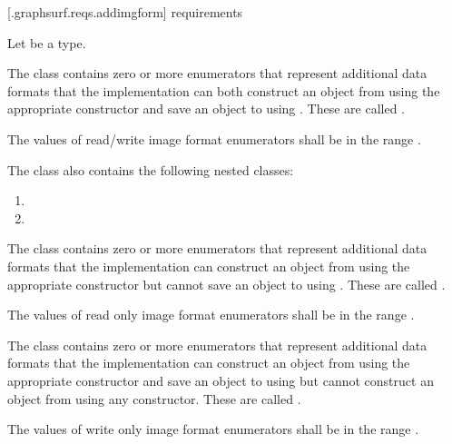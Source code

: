 
 [\iotwod.graphsurf.reqs.addimgform]{ requirements}

\pnum
Let  be a \graphicssurfacestemplparam type.

\pnum
The  class contains zero or more  enumerators that represent  additional data formats that the implementation can both construct an  object from using the appropriate constructor and save an  object to using . These are called .

\pnum
The values of read/write image format enumerators shall be in the range .

\pnum
The  class also contains the following nested classes:

\begin{enumerate}
\item {}
\item {}
\end{enumerate}

\pnum
The  class contains zero or more  enumerators that represent  additional data formats that the implementation can construct an  object from using the appropriate constructor but cannot save an  object to using . These are called .

\pnum
The values of read only image format enumerators shall be in the range .

\pnum
The  class contains zero or more  enumerators that represent  additional data formats that the implementation can construct an  object from using the appropriate constructor and save an  object to using  but cannot construct an  object from using any constructor. These are called .

\pnum
The values of write only image format enumerators shall be in the range .
